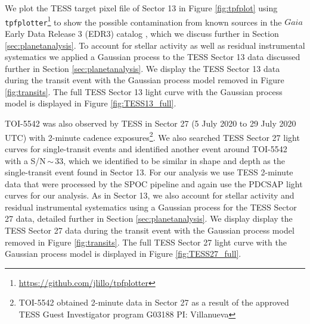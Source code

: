 \documentclass{aa}
\begin{document}
We plot the TESS target pixel file of Sector 13 in Figure \ref{fig:tpfplot} using \texttt{tpfplotter}\footnote{\url{https://github.com/jlillo/tpfplotter}} \citep{Aller2020} to show the possible contamination from known sources in the $Gaia$ Early Data Release 3 (EDR3) catalog \citep{GaiaCollaboration2021}, which we discuss further in Section \ref{sec:planetanalysis}. To account for stellar activity as well as residual instrumental systematics we applied a Gaussian process \citep[e.g.,][]{Gibson2014,Haywood2014} to the TESS Sector 13 data discussed further in Section \ref{sec:planetanalysis}. We display the TESS Sector 13 data during the transit event with the Gaussian process model removed in Figure \ref{fig:transits}. The full TESS Sector 13 light curve with the Gaussian process model is displayed in Figure \ref{fig:TESS13_full}.

TOI-5542 was also observed by TESS in Sector 27 (5 July 2020 to 29 July 2020 UTC) with 2-minute cadence exposures\footnote{TOI-5542 obtained 2-minute data in Sector 27 as a result of the approved TESS Guest Investigator program G03188 PI: Villanueva}. We also searched TESS Sector 27 light curves for single-transit events and identified another event around TOI-5542 with a S/N\,$\sim$\,33, which we identified to be similar in shape and depth as the single-transit event found in Sector 13. For our analysis we use TESS 2-minute data that were processed by the SPOC pipeline and again use the PDCSAP light curves for our analysis. As in Sector 13, we also account for stellar activity and residual instrumental systematics using a Gaussian process for the TESS Sector 27 data, detailed further in Section \ref{sec:planetanalysis}. We display display the TESS Sector 27 data during the transit event with the Gaussian process model removed in Figure \ref{fig:transits}. The full TESS Sector 27 light curve with the Gaussian process model is displayed in Figure \ref{fig:TESS27_full}.
\end{document}
